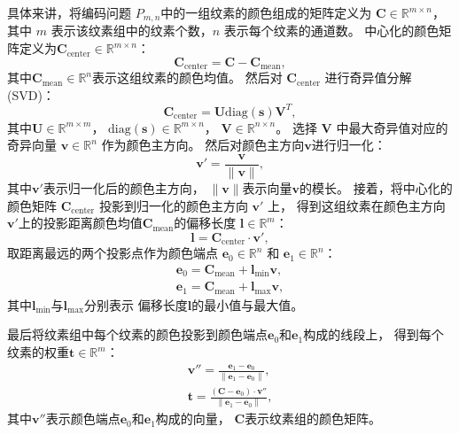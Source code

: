 具体来讲，将编码问题 $P_{m,n}$中的一组纹素的颜色组成的矩阵定义为
$\mathbf{C}\in\mathbb{R}^{m\times n}$，其中 $m$ 表示该纹素组中的纹素个数，$n$ 表示每个纹素的通道数。
中心化的颜色矩阵定义为$\mathbf{C}_{\text{center}}\in\mathbb{R}^{m\times n}$：
\begin{equation}
\mathbf{C}_{\text{center}}=\mathbf{C}-\mathbf{C}_{\text{mean}},
\end{equation}
其中$\mathbf{C}_{\text{mean}}\in\mathbb{R}^{n}$表示这组纹素的颜色均值。
然后对 $\mathbf{C}_{\text{center}}$ 进行奇异值分解(SVD)：
\begin{equation}
\mathbf{C}_{\text{center}}=\mathbf{U}\text{diag}(\mathbf{s})\mathbf{V}^T,
\end{equation}
其中$\mathbf{U}\in \mathbb{R}^{m \times m}$，
$\text{diag}(\mathbf{s})\in\mathbb{R}^{m\times n}$，
$\mathbf{V}\in \mathbb{R}^{n\times n}$。
选择 $\mathbf{V}$ 中最大奇异值对应的奇异向量 $\mathbf{v}\in \mathbb{R}^{n}$ 作为颜色主方向。
然后对颜色主方向$\mathbf{v}$进行归一化：
\begin{equation}
    \mathbf{v}'=\frac{\mathbf{v}}{\|\mathbf{v}\|},
\end{equation}
其中$\mathbf{v}'$表示归一化后的颜色主方向，
$\|\mathbf{v}\|$表示向量$\mathbf{v}$的模长。
接着，将中心化的颜色矩阵 $\mathbf{C}_\text{center}$ 投影到归一化的颜色主方向 $\mathbf{v}'$ 上，
得到这组纹素在颜色主方向$\mathbf{v}'$上的投影距离颜色均值$\mathbf{C}_{\text{mean}}$的偏移长度 $\mathbf{l}\in\mathbb{R}^{m}$：
\begin{equation}
\mathbf{l}=\mathbf{C}_{\text{center}}\cdot\mathbf{v}',
\end{equation}
取距离最远的两个投影点作为颜色端点
$\mathbf{e}_0\in\mathbb{R}^n$ 和 $\mathbf{e}_1\in\mathbb{R}^n$：
\begin{align}
\mathbf{e}_0=\mathbf{C}_{\text{mean}}+\mathbf{l}_\text{min}\mathbf{v},\\
\mathbf{e}_1=\mathbf{C}_{\text{mean}}+\mathbf{l}_\text{max}\mathbf{v},
\end{align}
其中$\mathbf{l}_\text{min}$与$\mathbf{l}_\text{max}$分别表示
偏移长度$\mathbf{l}$的最小值与最大值。

最后将纹素组中每个纹素的颜色投影到颜色端点$\mathbf{e}_0$和$\mathbf{e}_1$构成的线段上，
得到每个纹素的权重$\mathbf{t}\in\mathbb{R}^m$：
\begin{align}
    \mathbf{v''}=\frac{\mathbf{e}_1-\mathbf{e}_0}{\|\mathbf{e}_1-\mathbf{e}_0\|},\\
    \mathbf{t}=\frac{(\mathbf{C}-\mathbf{e}_0)\cdot\mathbf{v''}}{\|\mathbf{e}_1-\mathbf{e}_0\|},
\end{align}
其中$\mathbf{v''}$表示颜色端点$\mathbf{e}_0$和$\mathbf{e}_1$构成的向量，
$\mathbf{C}$表示纹素组的颜色矩阵。

